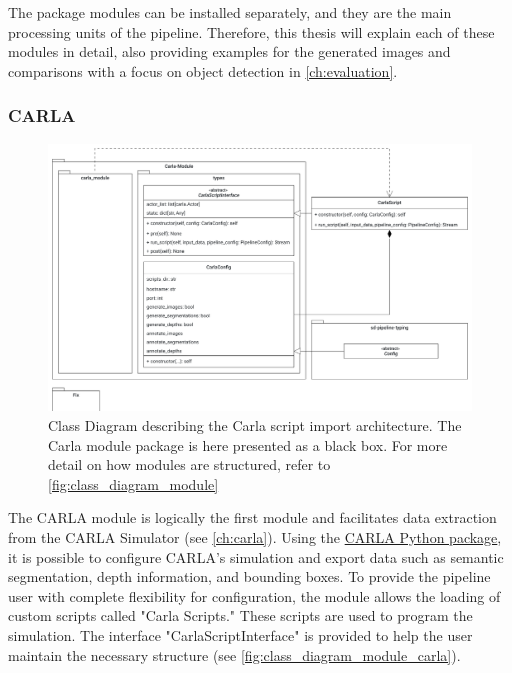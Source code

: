 The package modules can be installed separately, and they are the main processing units of the pipeline. Therefore, this thesis will explain each of these modules in detail, also providing examples for the generated images and comparisons with a focus on object detection in \autoref{ch:evaluation}.
\subsubsection{CARLA}

\begin{figure}[H]
  \centering
  \includegraphics[clip, trim=0cm 3cm 0cm 0cm,width=\textwidth]{figures/own_work/modules/class_diagram_carla_module.pdf}
  \caption{Class Diagram describing the Carla script import architecture. The Carla module package is here presented as a black box. For more detail on how modules are structured, refer to \autoref{fig:class_diagram_module}}
  \label{fig:class_diagram_module_carla}
  \clearpage
\end{figure}

The CARLA module is logically the first module and facilitates data extraction from the CARLA Simulator (see \autoref{ch:carla}). Using the \href{https://pypi.org/project/carla/}{CARLA Python package}, it is possible to configure CARLA's simulation and export data such as semantic segmentation, depth information, and bounding boxes. To provide the pipeline user with complete flexibility for configuration, the module allows the loading of custom scripts called "Carla Scripts." These scripts are used to program the simulation. The interface "CarlaScriptInterface" is provided to help the user maintain the necessary structure (see \autoref{fig:class_diagram_module_carla}).

